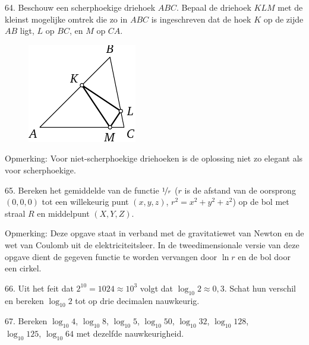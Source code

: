 \begin{problem}{64.}
	Beschouw een scherphoekige driehoek $ABC$. Bepaal de driehoek $KLM$ met de kleinst mogelijke omtrek die zo in $ABC$ is ingeschreven dat de hoek $K$ op de zijde $AB$ ligt, $L$ op $BC$, en $M$ op $CA$.
	\begin{figure}
		\includegraphics{resources/taskbook-48}
	\end{figure}

	\begin{note}{Opmerking:}
		Voor niet-scherphoekige driehoeken is de oplossing niet zo elegant als voor scherphoekige.
	\end{note}
\end{problem}

\begin{problem}{65.}
	Bereken het gemiddelde van de functie $\nicefrac{1}{r}$ ($r$ is de afstand van de oorsprong $(0,0,0)$ tot een willekeurig punt $(x,y,z)$, $r^2=x^2+y^2+z^2$) op de bol met straal $R$ en middelpunt $(X,Y,Z)$.
\\
	\begin{note}{Opmerking:}
		Deze opgave staat in verband met de gravitatiewet van Newton en de wet van Coulomb uit de elektriciteitsleer. In de tweedimensionale versie van deze opgave dient de gegeven functie te worden vervangen door $\ln r$ en de bol door een cirkel.
	\end{note}
\end{problem}

\begin{problem}{66.}
	Uit het feit dat $2^{10}=1024 \approx 10^3$ volgt dat $\log_{10} 2 \approx 0,3$. Schat hun verschil en bereken $\log_{10} 2$ tot op drie decimalen nauwkeurig.
\end{problem}

\begin{problem}{67.}
	Bereken $\log_{10} 4$, $\log_{10} 8$, $\log_{10} 5$, $\log_{10} 50$, $\log_{10} 32$, $\log_{10} 128$,\\$\log_{10} 125$, $\log_{10} 64$ met dezelfde nauwkeurigheid.
\end{problem}

